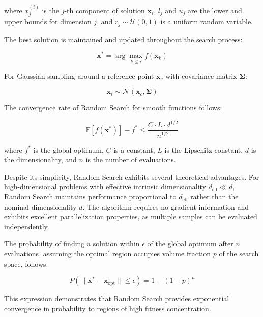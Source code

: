 where $x_j^{(i)}$ is the $j$-th component of solution $\mathbf{x}_i$, $l_j$ and $u_j$ are the lower and upper bounds for dimension $j$, and $r_j \sim \mathcal{U}(0,1)$ is a uniform random variable.

The best solution is maintained and updated throughout the search process:

\begin{equation}
\mathbf{x}^* = \arg\max_{k \leq i} f(\mathbf{x}_k)
\end{equation}

For Gaussian sampling around a reference point $\mathbf{x}_c$ with covariance matrix $\boldsymbol{\Sigma}$:

\begin{equation}
\mathbf{x}_i \sim \mathcal{N}(\mathbf{x}_c, \boldsymbol{\Sigma})
\end{equation}

The convergence rate of Random Search for smooth functions follows:

\begin{equation}
\mathbb{E}[f(\mathbf{x}^*)] - f^* \leq \frac{C \cdot L \cdot d^{1/2}}{n^{1/2}}
\end{equation}

where $f^*$ is the global optimum, $C$ is a constant, $L$ is the Lipschitz constant, $d$ is the dimensionality, and $n$ is the number of evaluations.

Despite its simplicity, Random Search exhibits several theoretical advantages. For high-dimensional problems with effective intrinsic dimensionality $d_{\text{eff}} \ll d$, Random Search maintains performance proportional to $d_{\text{eff}}$ rather than the nominal dimensionality $d$. The algorithm requires no gradient information and exhibits excellent parallelization properties, as multiple samples can be evaluated independently.

The probability of finding a solution within $\epsilon$ of the global optimum after $n$ evaluations, assuming the optimal region occupies volume fraction $p$ of the search space, follows:

\begin{equation}
P(\|\mathbf{x}^* - \mathbf{x}_{\text{opt}}\| \leq \epsilon) = 1 - (1-p)^n
\end{equation}

This expression demonstrates that Random Search provides exponential convergence in probability to regions of high fitness concentration.